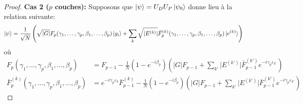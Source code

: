 \begin{proof}
\textbf{Cas 2 ($p$ couches):}
Supposons que $\ket{\psi} = U_{D}U_{P}\ket{\psi_{0}}$ donne lieu à la relation suivante:
\begin{equation}
\begin{aligned}
    \ket{\psi} &= \frac{1}{\sqrt{ N }} \left( \sqrt{ \lvert G \rvert } F_{p}(\gamma_{1}, \dots, \gamma_{p}, \beta_{1}, \dots, \beta_{p}) \ket{g_{i}} + \sum_{k} \sqrt{ \lvert E^{(k)} \rvert } \bar{F}^{(k)}_{p}(\gamma_{1}, \dots, \gamma_{p}, \beta_{1}, \dots, \beta_{p}) \ket{e^{(k)}} \right)
\end{aligned}
\end{equation}
où
\begin{equation}
\begin{aligned}
    F_{p}(\gamma_{1}, \dots, \gamma_{p}, \beta_{1}, \dots, \beta_{p}) &= F_{p-1} - \frac{1}{N} (1-e^{-i\beta_{p}}) \left( \lvert G \rvert   F_{p-1} + \sum_{k'} \lvert E^{(k')} \rvert \bar{F}^{(k')}_{p-1} e^{-i\gamma_{p}\varepsilon_{k'}} \right) \\
    \bar{F}^{(k)}_{p}(\gamma_{1}, \dots, \gamma_{p}, \beta_{1}, \dots, \beta_{p}) &= e^{-i\gamma_{p} \varepsilon_{k}}\bar{F}_{p-1}^{(k)} - \frac{1}{N} (1-e^{-i\beta_{p}}) \left( \lvert G \rvert   F_{p-1} + \sum_{k'} \lvert E^{(k')} \rvert \bar{F}^{(k')}_{p-1} e^{-i\gamma_{p}\varepsilon_{k'}} \right)
\end{aligned}
\end{equation}


\end{proof}
